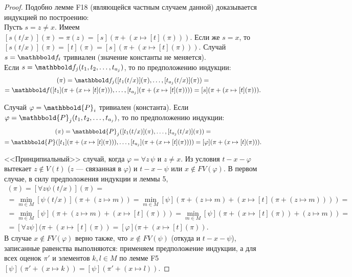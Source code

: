 \documentclass[a4paper, fleqn]{article}
\begin{document}
    \begin{proof} Подобно лемме F18 (являющейся частным случаем данной) доказывается индукцией по построению:\\[-10 pt]
    
    Пусть $s = z \ne x$. Имеем $[s(t/x)](\pi) = \pi(z) = [s](\pi + (x \mapsto [t](\pi)))$. Если же $s = x$, то $[s(t/x)](\pi) = [t](\pi) = [s](\pi + (x \mapsto [t](\pi)))$. Случай $s = \F_i$ тривиален (значение константы не меняется).\\[-10 pt]
    
    Если $s = \F_j(t_1, t_2, \ldots, t_{a_j})$, то по предположению индукции:
    \begin{multline*}
    [s(t/x)](\pi) = \F_j([t_1(t/x)](\pi), \ldots, [t_{a_j}(t/x)](\pi)) = \\
    = \F([t_1](\pi + (x \mapsto [t](\pi))), \ldots, [t_{a_j}](\pi + (x \mapsto [t](\pi)))) = [s](\pi + (x \mapsto [t](\pi))).
    \end{multline*}
    
    Случай $\varphi = \mathbbold{P}_i$ тривиален (константа). Если $\varphi = \mathbbold{P}_j(t_1, t_2, \ldots, t_{a_j})$, то по предположению индукции:
    \begin{multline*}
    [\varphi(t/x)](\pi) = \mathbbold{P}_j([t_1(t/x)](\pi), \ldots, [t_{a_j}(t/x)](\pi)) = \\
    = \mathbbold{P}([t_1](\pi + (x \mapsto [t](\pi))), \ldots, [t_{a_j}](\pi + (x \mapsto [t](\pi)))) = [\varphi](\pi + (x \mapsto [t](\pi))).
    \end{multline*}
    
    <<Принципиальный>> случай, когда $\varphi = \forall z\, \psi$ и $z \ne x$. Из условия $t-x-\varphi$ вытекает $z \not\in V(t)$ ($z$ --- связанная в $\varphi$) и $t - x - \psi$ или $x \not\in FV(\varphi)$. В первом случае, в силу предположения индукции и леммы 5,
    \begin{multline*}
    [\varphi(t/x)](\pi) = [\forall z \psi(t/x)](\pi) = \\
    = \min\limits_{m \in M}[\psi(t/x)](\pi + (z \mapsto m)) = 
    \min\limits_{m \in M}[\psi](\pi + (z \mapsto m) + (x \mapsto [t](\pi + (z \mapsto m)))) = \\
    = \min\limits_{m \in M}[\psi](\pi + (z \mapsto m) + (x \mapsto [t](\pi))) =
    \min\limits_{m \in M}[\psi](\pi + (x \mapsto [t](\pi)) + (z \mapsto m)) = \\
     = [\forall z \psi](\pi + (x \mapsto [t](\pi)) = [\varphi](\pi + (x \mapsto [t](\pi)).
    \end{multline*}
    В случае $x \not\in FV(\varphi)$ верно также, что $x \not\in FV(\psi)$ (откуда и $t-x-\psi$), записанные равенства выполняются: применяем предположение индукции, а для всех оценок $\pi'$ и элементов $k, l \!\in\! M$ по лемме F5 $[\psi](\pi' + (x \mapsto k)) = [\psi](\pi' + (x \mapsto l))$.
    \end{proof}
    
\end{document}
